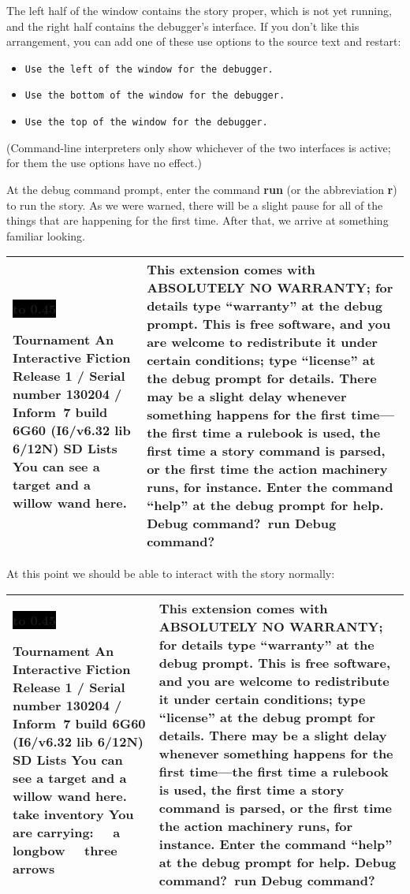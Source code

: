 \documentclass{book}
\newcommand{\n}{\hspace*{\fill}\newline}
\newcommand{\terp}[2]{\begin{center}\begin{tabular}{p{0.45\textwidth}|p{0.45\textwidth}}\midrule #1&#2\\\midrule\end{tabular}\end{center}}
\newcommand{\glkheading}[1]{\textbf{#1}}
\newcommand{\glkinput}[1]{\textbf{#1}}
\newcommand{\glkstatusline}[2]{\centerline{\colorbox{black}{\hbox to 0.45\textwidth{\textcolor{white}{#1\hfil #2}}}}}
\newcommand{\storyprompt}{\raisebox{1.5pt}{\(>\)}}
\newcommand{\cursor}{\raisebox{-1.5pt}{\RectangleThin}}
\begin{document}
The left half of the window contains the story proper, which is not yet running,
and the right half contains the debugger's interface.  If you don't like this
arrangement, you can add one of these use options to the source text and
restart:

\begin{itemize}
  \item{\lstinline{Use the left of the window for the debugger.}}
  \item{\lstinline{Use the bottom of the window for the debugger.}}
  \item{\lstinline{Use the top of the window for the debugger.}}
\end{itemize}

(Command-line interpreters only show whichever of the two interfaces is active;
for them the use options have no effect.)

At the debug command prompt, enter the command \glkinput{run} (or the
abbreviation \glkinput{r}) to run the story.  As we were warned, there will be a
slight pause for all of the things that are happening for the first time.  After
that, we arrive at something familiar looking.

\terp{\glkstatusline{Lists}{0/1}\n
  \glkheading{Tournament}\n
  An Interactive Fiction\n
  Release 1 / Serial number 130204 / Inform~7 build 6G60 (I6/v6.32 lib 6/12N) SD\n
  \n
  \glkheading{Lists}\n
  You can see a target and a willow wand here.\n
  \n
  \storyprompt\cursor}{%
  \n
  This extension comes with ABSOLUTELY NO WARRANTY; for details type ``warranty'' at the debug prompt.\n
  \n
  This is free software, and you are welcome to redistribute it under certain conditions; type ``license'' at the debug prompt for details.\n
  \n
  There may be a slight delay whenever something happens for the first time---the first time a rulebook is used, the first time a story command is parsed, or the first time the action machinery runs, for instance.\n
  \n
  Enter the command ``help'' at the debug prompt for help.\n
  \n
  Debug command?\ \glkinput{run}\n
  \n
  Debug command?\ \cursor}

At this point we should be able to interact with the story normally:

\terp{\glkstatusline{Lists}{0/2}\n
  \glkheading{Tournament}\n
  An Interactive Fiction\n
  Release 1 / Serial number 130204 / Inform~7 build 6G60 (I6/v6.32 lib 6/12N) SD\n
  \n
  \glkheading{Lists}\n
  You can see a target and a willow wand here.\n
  \n
  \storyprompt\glkinput{take inventory}\n
  You are carrying:\n
  \null\ \ a longbow\n
  \null\ \ three arrows\n
  \n
  \storyprompt\cursor}{%
  \n
  This extension comes with ABSOLUTELY NO WARRANTY; for details type ``warranty'' at the debug prompt.\n
  \n
  This is free software, and you are welcome to redistribute it under certain conditions; type ``license'' at the debug prompt for details.\n
  \n
  There may be a slight delay whenever something happens for the first time---the first time a rulebook is used, the first time a story command is parsed, or the first time the action machinery runs, for instance.\n
  \n
  Enter the command ``help'' at the debug prompt for help.\n
  \n
  Debug command?\ \glkinput{run}\n
  \n
  Debug command?\ \cursor}
\end{document}
